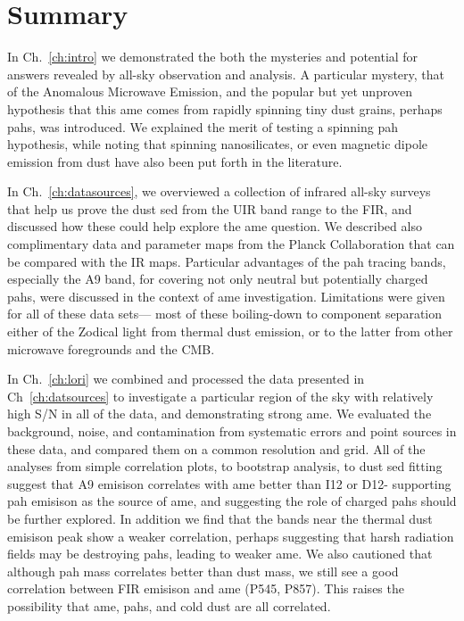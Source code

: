 \chapter{Summary}
  \label{ch:Summary}

  In Ch.~\ref{ch:intro} we demonstrated the both the mysteries and potential for answers revealed by all-sky observation and analysis. A particular mystery, that of the Anomalous Microwave Emission, and the popular but yet unproven hypothesis that this \acrshort{ame} comes from rapidly spinning tiny dust grains, perhaps \acrshort{pah}s, was introduced. We explained the merit of testing a spinning \acrshort{pah} hypothesis, while noting that spinning nanosilicates, or even magnetic dipole emission from dust have also been put forth in the literature.

  In Ch.~\ref{ch:datasources}, we overviewed a collection of infrared all-sky surveys that help us prove the dust \acrshort{sed} from the UIR band range to the FIR, and discussed how these could help explore the \acrshort{ame} question. We described also complimentary data and parameter maps from the Planck Collaboration that can be compared with the IR maps. Particular advantages of the \acrshort{pah} tracing bands, especially the A9 band, for covering not only neutral but potentially charged \acrshort{pah}s, were discussed in the context of \acrshort{ame} investigation. Limitations were given for all of these data sets--- most of these boiling-down to component separation either of the Zodical light from thermal dust emission, or to the latter from other microwave foregrounds and the CMB.

  In Ch.~\ref{ch:lori} we combined and processed the data presented in Ch~\ref{ch:datsources} to investigate a particular region of the sky with relatively high S/N in all of the data, and demonstrating strong \acrshort{ame}. We evaluated the background, noise, and contamination from systematic errors and point sources in these data, and compared them on a common resolution and grid. All of the analyses from simple correlation plots, to bootstrap analysis, to dust \acrshort{sed} fitting suggest that A9 emisison correlates with \acrshort{ame} better than I12 or D12- supporting \acrshort{pah} emisison as the source of \acrshort{ame}, and suggesting the role of charged \acrshort{pah}s should be further explored. In addition we find that the bands near the thermal dust emisison peak show a weaker correlation, perhaps suggesting that harsh radiation fields may be destroying \acrshort{pah}s, leading to weaker \acrshort{ame}. We also cautioned that although \acrshort{pah} mass correlates better than dust mass, we still see a good correlation between FIR emisison and \acrshort{ame} (P545, P857). This raises the possibility that \acrshort{ame}, \acrshort{pah}s, and cold dust are all correlated.

